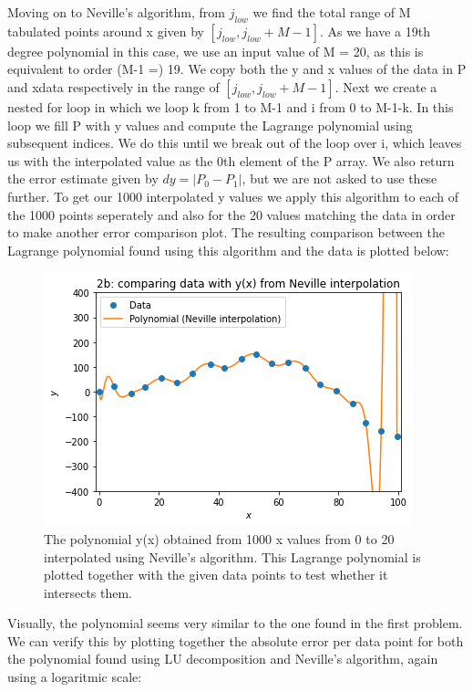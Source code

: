 Moving on to Neville's algorithm, from $j_{low}$ we find the total range of M tabulated points around x given by $[j_{low},j_{low}+M-1]$. As we have a 19th degree polynomial in this case, we use an input value of M = 20, as this is equivalent to order (M-1 =) 19. We copy both the y and x values of the data in P and xdata respectively in the range of $[j_{low},j_{low}+M-1]$. Next we create a nested for loop in which we loop k from 1 to M-1 and i from 0 to M-1-k. In this loop we fill P with y values and compute the Lagrange polynomial using subsequent indices. We do this until we break out of the loop over i, which leaves us with the interpolated value as the 0th element of the P array. We also return the error estimate given by $dy = |P_{0} - P_{1}|$, but we are not asked to use these further. To get our 1000 interpolated y values we apply this algorithm to each of the 1000 points seperately and also for the 20 values matching the data in order to make another error comparison plot. The resulting comparison between the Lagrange polynomial found using this algorithm and the data is plotted below:

\begin{figure}[h!]
  \centering
  \includegraphics[width=0.6\linewidth]{problem2b1.png}
  \caption{The polynomial y(x) obtained from 1000 x values from 0 to 20 interpolated using Neville's algorithm. This Lagrange polynomial is plotted together with the given data points to test whether it intersects them.}
  \label{fig:fig3}
\end{figure}

Visually, the polynomial seems very similar to the one found in the first problem. We can verify this by plotting together the absolute error per data point for both the polynomial found using LU decomposition and Neville's algorithm, again using a logaritmic scale: 

